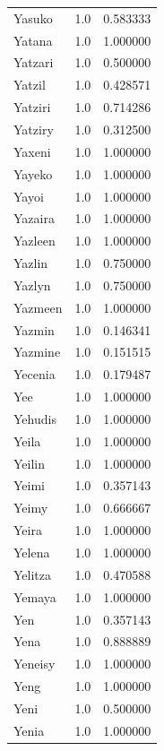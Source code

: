 \documentclass[
  letterpaper,
  DIV=11,
  numbers=noendperiod]{scrreprt}
\begin{document}
\begin{tabular}{lrr}
Yasuko          &   1.0 &   0.583333 \\
Yatana          &   1.0 &   1.000000 \\
Yatzari         &   1.0 &   0.500000 \\
Yatzil          &   1.0 &   0.428571 \\
Yatziri         &   1.0 &   0.714286 \\
Yatziry         &   1.0 &   0.312500 \\
Yaxeni          &   1.0 &   1.000000 \\
Yayeko          &   1.0 &   1.000000 \\
Yayoi           &   1.0 &   1.000000 \\
Yazaira         &   1.0 &   1.000000 \\
Yazleen         &   1.0 &   1.000000 \\
Yazlin          &   1.0 &   0.750000 \\
Yazlyn          &   1.0 &   0.750000 \\
Yazmeen         &   1.0 &   1.000000 \\
Yazmin          &   1.0 &   0.146341 \\
Yazmine         &   1.0 &   0.151515 \\
Yecenia         &   1.0 &   0.179487 \\
Yee             &   1.0 &   1.000000 \\
Yehudis         &   1.0 &   1.000000 \\
Yeila           &   1.0 &   1.000000 \\
Yeilin          &   1.0 &   1.000000 \\
Yeimi           &   1.0 &   0.357143 \\
Yeimy           &   1.0 &   0.666667 \\
Yeira           &   1.0 &   1.000000 \\
Yelena          &   1.0 &   1.000000 \\
Yelitza         &   1.0 &   0.470588 \\
Yemaya          &   1.0 &   1.000000 \\
Yen             &   1.0 &   0.357143 \\
Yena            &   1.0 &   0.888889 \\
Yeneisy         &   1.0 &   1.000000 \\
Yeng            &   1.0 &   1.000000 \\
Yeni            &   1.0 &   0.500000 \\
Yenia           &   1.0 &   1.000000 \\

\end{tabular}
\end{document}
